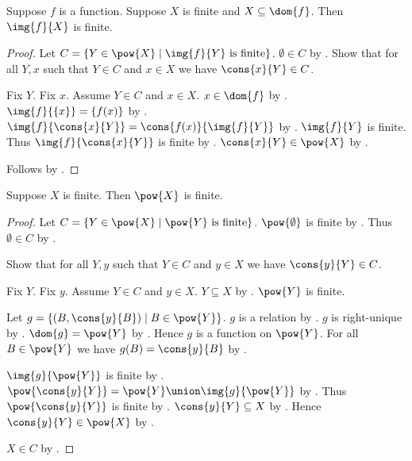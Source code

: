 \begin{proposition}\label{finite_function_image}
    Suppose $f$ is a function.
    Suppose $X$ is finite and $X\subseteq\dom{f}$.
    Then $\img{f}{X}$ is finite.
\end{proposition}
\begin{proof}
    Let $C=\{Y\in\pow{X}\mid \text{$\img{f}{Y}$ is finite}\}$.
    $\emptyset\in C$ by .
    Show that for all $Y,x$ such that $Y\in C$ and $x\in X$ we have
        $\cons{x}{Y}\in C$.
    \begin{subproof}
        Fix $Y$.
        Fix $x$.
        Assume $Y\in C$ and $x\in X$.
        $x\in\dom{f}$ by .
        $\img{f}{\{x\}}=\{f(x)\}$
            by .
        $\img{f}{\cons{x}{Y}}=\cons{f(x)}{\img{f}{Y}}$
            by .
        $\img{f}{Y}$ is finite.
        Thus $\img{f}{\cons{x}{Y}}$ is finite by .
        $\cons{x}{Y}\in\pow{X}$
            by .
    \end{subproof}
    Follows by .
\end{proof}

\begin{classification}\label{finite_powerset}
    Suppose $X$ is finite.
    Then $\pow{X}$ is finite.
\end{classification}
\begin{proof}
    Let $C=\{Y\in\pow{X}\mid \text{$\pow{Y}$ is finite}\}$.
    $\pow{\emptyset}$ is finite
        by .
    Thus $\emptyset\in C$ by .

    Show that for all $Y,y$ such that $Y\in C$ and $y\in X$ we have
        $\cons{y}{Y}\in C$.
    \begin{subproof}
        Fix $Y$.
        Fix $y$.
        Assume $Y\in C$ and $y\in X$.
        $Y\subseteq X$ by .
        $\pow{Y}$ is finite.

        Let $g=\{(B,\cons{y}{B})\mid B\in\pow{Y}\}$.
        $g$ is a relation by .
        $g$ is right-unique by .
        $\dom{g}=\pow{Y}$ by .
        Hence $g$ is a function on $\pow{Y}$.
        For all $B\in\pow{Y}$ we have $g(B)=\cons{y}{B}$
            by .

        $\img{g}{\pow{Y}}$ is finite
            by .
        $\pow{\cons{y}{Y}}=\pow{Y}\union\img{g}{\pow{Y}}$
            by .
        Thus $\pow{\cons{y}{Y}}$ is finite
            by .
        $\cons{y}{Y}\subseteq X$ by .
        Hence $\cons{y}{Y}\in\pow{X}$ by .
    \end{subproof}
    $X\in C$ by .
\end{proof}

